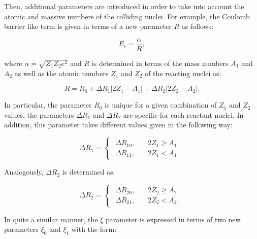 \documentclass[openany]{book}
\begin{document}
Then, additional parameters are introduced in order to take into account the atomic and massive numbers of the colliding nuclei. For example, the Coulomb barrier like term is given in terms of a new parameter $R$ as follows:

\begin{equation} \label{eq:potential_Yakovlev_Ec}
	E_c = \frac{\alpha}{R},
\end{equation}

where $\alpha = \sqrt{Z_1Z_2e^2}$ and $R$ is determined in terms of the mass numbers $A_1$ and $A_2$ as well as the atomic numbers $Z_1$ and $Z_2$ of the reacting nuclei as:

\begin{equation} \label{eq:potential_Yakovlev_R}
	R = R_0 + \Delta R_{1} |2Z_1 - A_1| + \Delta R_{2}|2Z_2 - A_2|.
\end{equation}

In particular, the parameter $R_0$ is unique for a given combination of $Z_1$ and $Z_2$ values,  the parameters $\Delta R_{1}$ and $\Delta R_{2}$ are specific for each reactant nuclei. In addition, this parameter takes different values given in the following way: 

\begin{equation} \label{eq:potential_Yakovlev_R1}
	\Delta R_1= 	\left\{\begin{array}{l}
		\begin{split}
			\Delta R_{10}, \quad & 2Z_1 \ge A_1.\\ 
			\Delta R_{11}, \quad & 2Z_1 < A_1.
		\end{split}
	\end{array}\right.
\end{equation}

Analogously, $\Delta R_2$ is determined as: 

\begin{equation} \label{eq:potential_Yakovlev_R2}
	\Delta R_2= 	\left\{\begin{array}{l}
		\begin{split}
			\Delta R_{20}, \quad & 2Z_2 \ge A_2.\\ 
			\Delta R_{21}, \quad & 2Z_2 < A_2.
		\end{split}
	\end{array}\right.
\end{equation}

In quite a similar manner, the $\xi$ parameter is expressed in terms of two new parameters $\xi_0$ and $\xi_1$ with the form:
\end{document}
